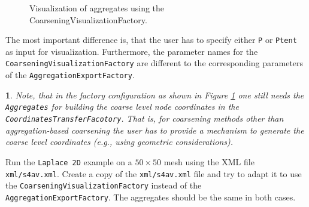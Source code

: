 \documentclass[10pt,fleqn]{book}
\newtheorem*{mycomment}{\ding{42}}
\begin{document}
\begin{figure}
\begin{center}
{
} %
\end{center}
\caption{Visualization of aggregates using the CoarseningVisualizationFactory.}
\label{fig:simpledesignaggregatesvis2}
\end{figure}

The most important difference is, that the user has to specify either \verb|P| or \verb|Ptent| as input for visualization. Furthermore, the parameter names for the \verb|CoarseningVisualizationFactory| are different to the corresponding parameters of the \verb|AggregationExportFactory|.

\begin{mycomment}
Note, that in the factory configuration as shown in Figure \ref{fig:simpledesignaggregatesvis2} one still needs the \verb|Aggregates| for building the coarse level node coordinates in the \verb|CoordinatesTransferFacotory|. That is, for coarsening methods other than aggregation-based coarsening the user has to provide a mechanism to generate the coarse level coordinates (e.g., using geometric considerations).
\end{mycomment}

\begin{exercise}
Run the \verb|Laplace 2D| example on a $50\times 50$ mesh using the XML file \verb|xml/s4av.xml|. Create a copy of the \verb|xml/s4av.xml| file and try to adapt it to use the \verb|CoarseningVisualizationFactory| instead of the \verb|AggregationExportFactory|. The aggregates should be the same in both cases.
\end{exercise}
\end{document}
